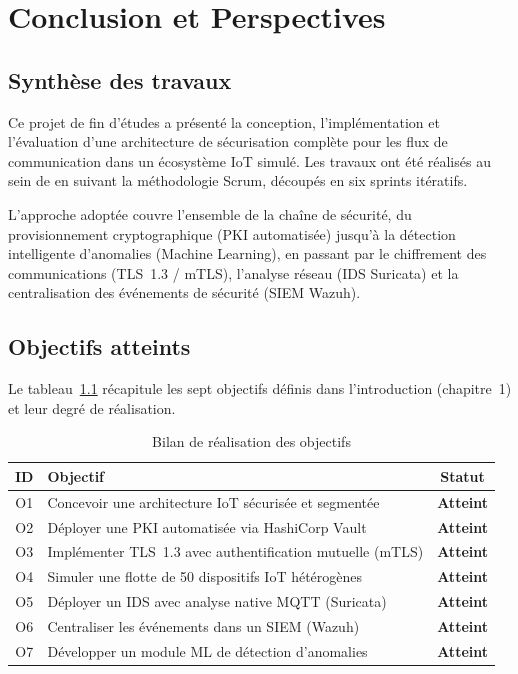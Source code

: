 \chapter{Conclusion et Perspectives}

\section{Synthèse des travaux}

Ce projet de fin d'études a présenté la conception, l'implémentation et l'évaluation d'une architecture de sécurisation complète pour les flux de communication dans un écosystème IoT simulé. Les travaux ont été réalisés au sein de \TT{} en suivant la méthodologie Scrum, découpés en six sprints itératifs.

L'approche adoptée couvre l'ensemble de la chaîne de sécurité, du provisionnement cryptographique (PKI automatisée) jusqu'à la détection intelligente d'anomalies (Machine Learning), en passant par le chiffrement des communications (TLS~1.3 / mTLS), l'analyse réseau (IDS Suricata) et la centralisation des événements de sécurité (SIEM Wazuh).

\section{Objectifs atteints}

Le tableau~\ref{tab:objectifs} récapitule les sept objectifs définis dans l'introduction (chapitre~1) et leur degré de réalisation.

\begin{table}[H]
\centering
\caption{Bilan de réalisation des objectifs}
\label{tab:objectifs}
\begin{tabular}{clc}
\toprule
\textbf{ID} & \textbf{Objectif} & \textbf{Statut} \\
\midrule
O1 & Concevoir une architecture IoT sécurisée et segmentée & \textcolor{green!60!black}{\textbf{Atteint}} \\
O2 & Déployer une PKI automatisée via HashiCorp Vault & \textcolor{green!60!black}{\textbf{Atteint}} \\
O3 & Implémenter TLS~1.3 avec authentification mutuelle (mTLS) & \textcolor{green!60!black}{\textbf{Atteint}} \\
O4 & Simuler une flotte de 50 dispositifs IoT hétérogènes & \textcolor{green!60!black}{\textbf{Atteint}} \\
O5 & Déployer un IDS avec analyse native MQTT (Suricata) & \textcolor{green!60!black}{\textbf{Atteint}} \\
O6 & Centraliser les événements dans un SIEM (Wazuh) & \textcolor{green!60!black}{\textbf{Atteint}} \\
O7 & Développer un module ML de détection d'anomalies & \textcolor{green!60!black}{\textbf{Atteint}} \\
\bottomrule
\end{tabular}
\end{table}

